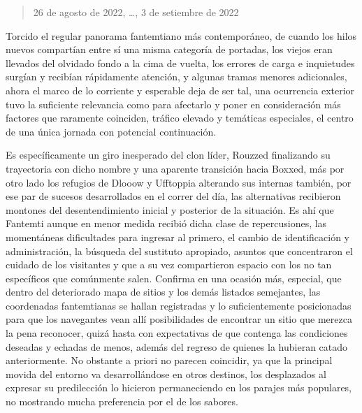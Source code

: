 \documentclass[
]{book}
\begin{document}
\begin{quote}
26 de agosto de 2022, \ldots, 3 de setiembre de 2022
\end{quote}

Torcido el regular panorama fantemtiano más contemporáneo, de cuando los hilos nuevos compartían entre sí una misma categoría de portadas, los viejos eran llevados del olvidado fondo a la cima de vuelta, los errores de carga e inquietudes surgían y recibían rápidamente atención, y algunas tramas menores adicionales, ahora el marco de lo corriente y esperable deja de ser tal, una ocurrencia exterior tuvo la suficiente relevancia como para afectarlo y poner en consideración más factores que raramente coinciden, tráfico elevado y temáticas especiales, el centro de una única jornada con potencial continuación.

Es específicamente un giro inesperado del clon líder, Rouzzed finalizando su trayectoria con dicho nombre y una aparente transición hacia Boxxed, más por otro lado los refugios de Dlooow y Ufftoppia alterando sus internas también, por ese par de sucesos desarrollados en el correr del día, las alternativas recibieron montones del desentendimiento inicial y posterior de la situación. Es ahí que Fantemti aunque en menor medida recibió dicha clase de repercusiones, las momentáneas dificultades para ingresar al primero, el cambio de identificación y administración, la búsqueda del sustituto apropiado, asuntos que concentraron el cuidado de los visitantes y que a su vez compartieron espacio con los no tan específicos que comúnmente salen. Confirma en una ocasión más, especial, que dentro del deteriorado mapa de sitios y los demás listados semejantes, las coordenadas fantemtianas se hallan registradas y lo suficientemente posicionadas para que los navegantes vean allí posibilidades de encontrar un sitio que merezca la pena reconocer, quizá hasta con expectativas de que contenga las condiciones deseadas y echadas de menos, además del regreso de quienes la hubieran catado anteriormente. No obstante a priori no parecen coincidir, ya que la principal movida del entorno va desarrollándose en otros destinos, los desplazados al expresar su predilección lo hicieron permaneciendo en los parajes más populares, no mostrando mucha preferencia por el de los sabores.
\end{document}
